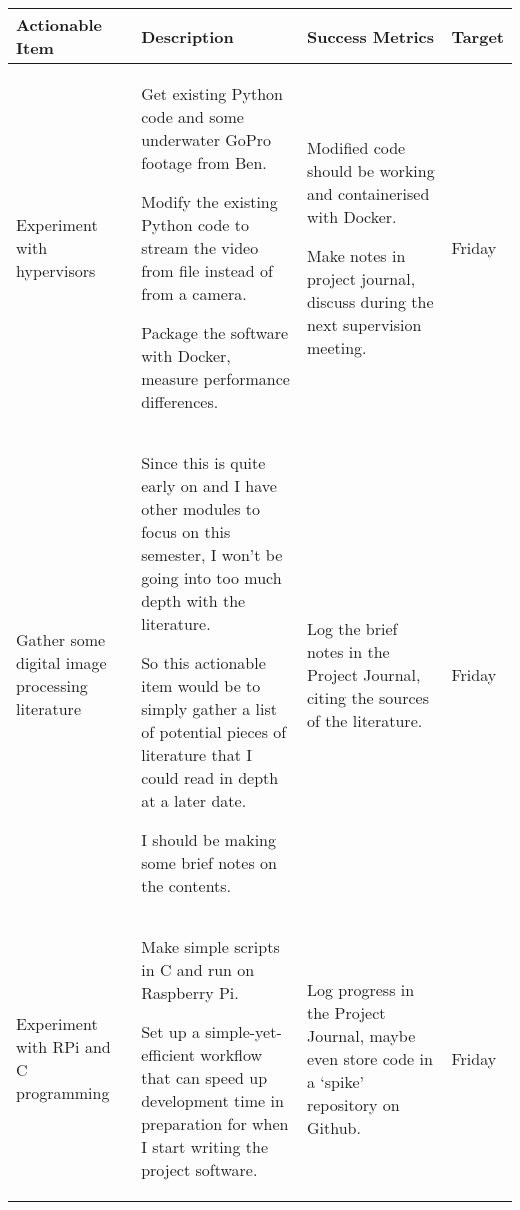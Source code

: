 \begin{table}[!h]
    \centering
    \begin{tabularx}{\textwidth}{|X|X|X|l|}
        \hline
        Actionable Item & Description & Success Metrics & Target \\
        \hline
        \hline
        Experiment with hypervisors &
        \begin{myitemize}
            \item Get existing Python code and some underwater GoPro footage from Ben.
            \item Modify the existing Python code to stream the video from file instead of from a camera.
            \item Package the software with Docker, measure performance differences.
        \end{myitemize} &
        \begin{myitemize}
            \item Modified code should be working and containerised with Docker.
            \item Make notes in project journal, discuss during the next supervision meeting.
        \end{myitemize} &
        Friday \\
        \hline
        Gather some digital image processing literature &
        \begin{myitemize}
            \item Since this is quite early on and I have other modules to focus on this semester, I won't be going into too much depth with the literature.
            \item So this actionable item would be to simply gather a list of potential pieces of literature that I could read in depth at a later date.
            \item I should be making some brief notes on the contents.
        \end{myitemize} &
        \begin{myitemize}
            \item Log the brief notes in the Project Journal, citing the sources of the literature.
        \end{myitemize} &
        Friday \\
        \hline
        Experiment with RPi and C programming &
        \begin{myitemize}
            \item Make simple scripts in C and run on Raspberry Pi.
            \item Set up a simple-yet-efficient workflow that can speed up development time in preparation for when I start writing the project software.
        \end{myitemize} &
        \begin{myitemize}
            \item Log progress in the Project Journal, maybe even store code in a `spike' repository on Github.
        \end{myitemize} &
        Friday \\
        \hline
    \end{tabularx}
\end{table}
